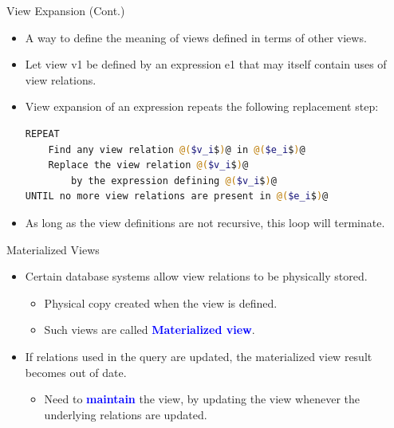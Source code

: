 \documentclass{beamer}
\begin{document}
\begin{frame}[fragile]{View Expansion (Cont.)}
    \begin{itemize}
        \item A way to define the meaning of views defined in terms of other views.
        \item Let view v1 be defined by an expression e1 that may itself contain uses of view relations.
        \item View expansion of an expression repeats the following replacement step:
            \footnotesize
            \begin{lstlisting}[language=bash]
REPEAT
    Find any view relation @($v_i$)@ in @($e_i$)@
    Replace the view relation @($v_i$)@
        by the expression defining @($v_i$)@
UNTIL no more view relations are present in @($e_i$)@
            \end{lstlisting}
            \normalsize
        \item As long as the view definitions are not recursive, this loop will terminate.
    \end{itemize}
\end{frame}

\begin{frame}{Materialized Views}
    \begin{itemize}
        \item Certain database systems allow view relations to be physically stored.
            \begin{itemize}
                \item Physical copy created when the view is defined.
                \item Such views are called \textbf{\textcolor{blue}{Materialized view}}.
            \end{itemize}
        \item If relations used in the query are updated, the materialized view result becomes out of date.
            \begin{itemize}
                \item Need to \textcolor{blue}{\textbf{maintain}} the view, by updating the view whenever the underlying relations are updated.
            \end{itemize}
    \end{itemize}
\end{frame}
\end{document}
